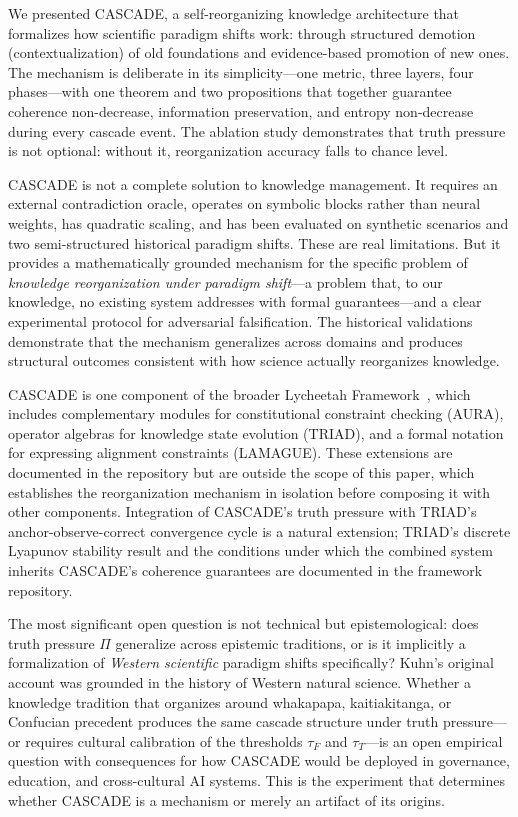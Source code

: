\documentclass[11pt,a4paper]{article}
\theoremstyle{definition}
\newcommand{\tp}{\Pi}
\begin{document}
We presented CASCADE, a self-reorganizing knowledge architecture that formalizes how
scientific paradigm shifts work: through structured demotion (contextualization) of old
foundations and evidence-based promotion of new ones. The mechanism is deliberate in
its simplicity---one metric, three layers, four phases---with one theorem and two
propositions that together guarantee coherence non-decrease, information preservation,
and entropy non-decrease during every cascade event. The ablation study demonstrates
that truth pressure is not optional: without it, reorganization accuracy falls to
chance level.

CASCADE is not a complete solution to knowledge management. It requires an external
contradiction oracle, operates on symbolic blocks rather than neural weights, has
quadratic scaling, and has been evaluated on synthetic scenarios and two semi-structured
historical paradigm shifts. These are real limitations. But it provides a
mathematically grounded mechanism for the specific problem of \emph{knowledge
reorganization under paradigm shift}---a problem that, to our knowledge, no existing
system addresses with formal guarantees---and a clear experimental protocol for
adversarial falsification. The historical validations demonstrate that the mechanism
generalizes across domains and produces structural outcomes consistent with how science
actually reorganizes knowledge.

CASCADE is one component of the broader Lycheetah Framework~\citep{clark2026lycheetah}, which includes
complementary modules for constitutional constraint checking (AURA), operator
algebras for knowledge state evolution (TRIAD), and a formal notation for
expressing alignment constraints (LAMAGUE). These extensions are documented in
the repository but are outside the scope of this paper, which establishes the
reorganization mechanism in isolation before composing it with other components.
Integration of CASCADE's truth pressure with TRIAD's anchor-observe-correct
convergence cycle is a natural extension; TRIAD's discrete Lyapunov stability
result and the conditions under which the combined system inherits CASCADE's
coherence guarantees are documented in the framework repository.

The most significant open question is not technical but epistemological: does
truth pressure $\tp$ generalize across epistemic traditions, or is it implicitly
a formalization of \emph{Western scientific} paradigm shifts specifically?
Kuhn's original account was grounded in the history of Western natural science.
Whether a knowledge tradition that organizes around whakapapa, kaitiakitanga,
or Confucian precedent produces the same cascade structure under truth pressure---
or requires cultural calibration of the thresholds $\tau_F$ and $\tau_T$---is an
open empirical question with consequences for how CASCADE would be deployed in
governance, education, and cross-cultural AI systems. This is the experiment that
determines whether CASCADE is a mechanism or merely an artifact of its origins.
\end{document}
